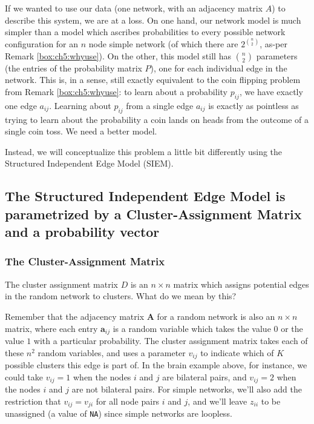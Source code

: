 If we wanted to use our data (one network, with an adjacency matrix $A$) to describe this system, we are at a loss. On one hand, our network model is much simpler than a model which ascribes probabilities to every possible network configuration for an $n$ node simple network (of which there are $2^{\binom n 2}$, as-per Remark \ref{box:ch5:whyuse}). On the other, this model still has $\binom n 2$ parameters (the entries of the probability matrix $P$), one for each individual edge in the network. This is, in a sense, still exactly equivalent to the coin flipping problem from Remark \ref{box:ch5:whyuse}: to learn about a probability $p_{ij}$, we have exactly one edge $a_{ij}$. Learning about $p_{ij}$ from a single edge $a_{ij}$ is exactly as pointless as trying to learn about the probability a coin lands on heads from the outcome of a single coin toss. We need a better model.

Instead, we will conceptualize this problem a little bit differently using the Structured Independent Edge Model (SIEM).
\subsection{The Structured Independent Edge Model is parametrized by a Cluster-Assignment Matrix and a probability vector}
\subsubsection{The Cluster-Assignment Matrix}

The cluster assignment matrix $D$ is an $n \times n$ matrix which assigns potential edges in the random network to clusters. What do we mean by this?

Remember that the adjacency matrix $\mathbf A$ for a random network is {also} an $n \times n$ matrix, where each entry $\mathbf a_{ij}$ is a random variable which takes the value $0$ or the value $1$ with a particular probability. The cluster assignment matrix takes each of these $n^2$ random variables, and uses a parameter $v_{ij}$ to indicate which of $K$ possible clusters this edge is part of. In the brain example above, for instance, we could take $v_{ij} = 1$ when the nodes $i$ and $j$ are bilateral pairs, and $v_{ij} = 2$ when the nodes $i$ and $j$ are not bilateral pairs. For simple networks, we'll also add the restriction that $v_{ij} = v_{ji}$ for all node pairs $i$ and $j$, and we'll leave $z_{ii}$ to be unassigned (a value of \texttt{NA}) since simple networks are loopless.

